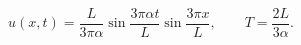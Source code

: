 \[u(x,t)=\frac{L}{3\pi\alpha}\sin\frac{3\pi\alpha t}{L}\sin\frac{3\pi x}{L},\qquad T=\frac{2L}{3\alpha}.\]
